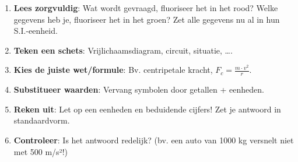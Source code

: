 \documentclass{ximera}
\begin{document}
\begin{example}
\begin{enumerate}
    \item \textbf{Lees zorgvuldig}: Wat wordt gevraagd, fluoriseer het in het rood? Welke gegevens heb je, fluoriseer het in het groen? Zet alle gegevens nu al in hun S.I.-eenheid.
    \item \textbf{Teken een schets}: Vrijlichaamsdiagram, circuit, situatie, \dots.
    \item \textbf{Kies de juiste wet/formule}: Bv. centripetale kracht, \(F_c = \frac{m\cdot v^2}{r}\).
    \item \textbf{Substitueer waarden}: Vervang symbolen door getallen + eenheden.
    \item \textbf{Reken uit}: Let op een eenheden en beduidende cijfers! Zet je antwoord in standaardvorm.
    \item \textbf{Controleer}: Is het antwoord redelijk? (bv. een auto van 1000 kg versnelt niet met 500 m/s²!)
\end{enumerate}
\end{example}


\end{document}

